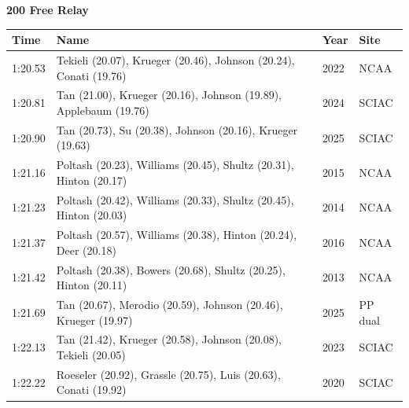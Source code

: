 \vspace{1.2em}
\noindent\begin{minipage}[t]{0.98\textwidth}
\centering
\textbf{\textcolor{teamprimary}{200 Free Relay}}\par
\vspace{0.5em}
\centering
\small
\renewcommand{\arraystretch}{1.0}
\setlength{\tabcolsep}{4pt}
\begin{tabular}{@{}p{2.7cm}p{4.3cm}p{1.6cm}p{2.7cm}@{}}
\toprule
\textbf{Time} & \textbf{Name} & \textbf{Year} & \textbf{Site} \\
\midrule
1:20.53 & Tekieli (20.07), Krueger (20.46), Johnson (20.24), Conati (19.76) & 2022 & NCAA \\
1:20.81 & Tan (21.00), Krueger (20.16), Johnson (19.89), Applebaum (19.76) & 2024 & SCIAC \\
1:20.90 & Tan (20.73), Su (20.38), Johnson (20.16), Krueger (19.63) & 2025 & SCIAC \\
1:21.16 & Poltash (20.23), Williams (20.45), Shultz (20.31), Hinton (20.17) & 2015 & NCAA \\
1:21.23 & Poltash (20.42), Williams (20.33), Shultz (20.45), Hinton (20.03) & 2014 & NCAA \\
1:21.37 & Poltash (20.57), Williams (20.38), Hinton (20.24), Deer (20.18) & 2016 & NCAA \\
1:21.42 & Poltash (20.38), Bowers (20.68), Shultz (20.25), Hinton (20.11) & 2013 & NCAA \\
1:21.69 & Tan (20.67), Merodio (20.59), Johnson (20.46), Krueger (19.97) & 2025 & PP dual \\
1:22.13 & Tan (21.42), Krueger (20.58), Johnson (20.08), Tekieli (20.05) & 2023 & SCIAC \\
1:22.22 & Roeseler (20.92), Grassle (20.75), Luis (20.63), Conati (19.92) & 2020 & SCIAC \\
\bottomrule
\end{tabular}
\end{minipage}
\vspace{1.2em}
